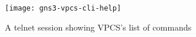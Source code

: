 \begin{figure}
  \centering
  \texttt{[image: gns3-vpcs-cli-help]}
  \caption{A telnet session showing VPCS's list of commands}
  \label{fig:gns3-vpcs-cli-help}
\end{figure}
